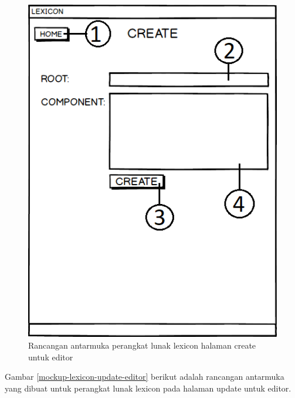 \begin{figure}[H]
\centering
\includegraphics[scale=0.8]{Gambar/mockup-lexicon-create-editor}
\caption{Rancangan antarmuka perangkat lunak lexicon halaman create untuk editor} 
\label{mockup-lexicon-create-editor}
\end{figure}

Gambar \ref{mockup-lexicon-update-editor} berikut adalah rancangan antarmuka yang dibuat untuk perangkat lunak lexicon pada halaman update untuk editor.

